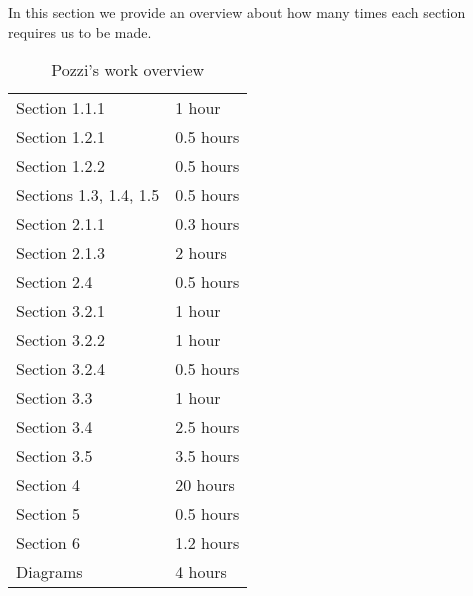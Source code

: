 In this section we provide an overview about how many times each section requires us to be made.


\begin{table} [H]
\centering
{}
{\centering
\begin{tabular}{m{2.5in}|m{.9in}}
Section 1.1.1 & 1 hour\\
Section 1.2.1 & 0.5 hours\\
Section 1.2.2 & 0.5 hours\\
Sections 1.3, 1.4, 1.5 & 0.5 hours\\
Section 2.1.1 & 0.3 hours\\
Section 2.1.3 & 2 hours\\
Section 2.4 & 0.5 hours\\
Section 3.2.1 & 1 hour\\
Section 3.2.2 & 1 hour\\
Section 3.2.4 & 0.5 hours\\
Section 3.3 & 1 hour\\
Section 3.4 & 2.5 hours\\
Section 3.5 & 3.5 hours\\
Section 4 & 20 hours\\
Section 5 & 0.5 hours\\
Section 6 & 1.2 hours\\
Diagrams & 4 hours
\end{tabular}
}
\caption{Pozzi's work overview}
\end{table}
